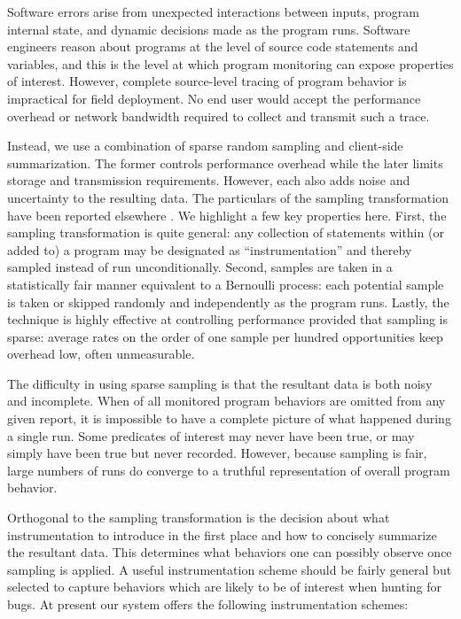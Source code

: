 \documentclass{sig-alternate}
\begin{document}
Software errors arise from unexpected interactions between inputs,
program internal state, and dynamic decisions made as the program
runs.  Software engineers reason about programs at the level of source
code statements and variables, and this is the level at which program
monitoring can expose properties of interest.  However, complete
source-level tracing of program behavior is impractical for field
deployment.  No end user would accept the performance overhead or
network bandwidth required to collect and transmit such a trace.

Instead, we use a combination of sparse random sampling and
client-side summarization.  The former controls performance overhead
while the later limits storage and transmission requirements.
However, each also adds noise and uncertainty to the resulting data.
The particulars of the sampling transformation have been reported
elsewhere \cite{PLDI`03*141}.  We highlight a few key properties here.
First, the sampling transformation is quite general: any collection of
statements within (or added to) a program may be designated as
``instrumentation'' and thereby sampled instead of run
unconditionally.  Second, samples are taken in a statistically fair
manner equivalent to a Bernoulli process: each potential sample is
taken or skipped randomly and independently as the program runs.
Lastly, the technique is highly effective at controlling performance
provided that sampling is sparse: average rates on the order of one
sample per hundred opportunities keep overhead low, often
unmeasurable.

The difficulty in using sparse sampling is that the resultant data is
both noisy and incomplete.  When  of all monitored
program behaviors are omitted from any given report, it is impossible
to have a complete picture of what happened during a single run.  Some
predicates of interest may never have been true, or may simply have
been true but never recorded.  However, because sampling is fair,
large numbers of runs do converge to a truthful representation of
overall program behavior.

Orthogonal to the sampling transformation is the decision about what
instrumentation to introduce in the first place and how to concisely
summarize the resultant data.  This determines what behaviors one can
possibly observe once sampling is applied.  A useful instrumentation
scheme should be fairly general but selected to capture behaviors
which are likely to be of interest when hunting for bugs.  At present
our system offers the following instrumentation schemes:
\end{document}
